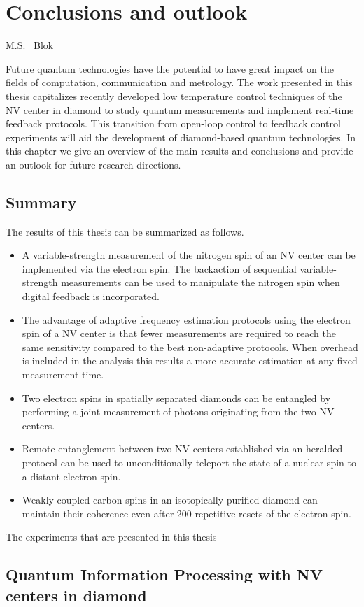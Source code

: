 \graphicspath{{./ch_conclusion_and_outlook/figures/}}

\chapter{Conclusions and outlook}
\label{ch:conclusion}

\begin{center} 
    \vspace{-1cm} {M.S. ~Blok} 
\end{center}

Future quantum technologies have the potential to have great impact on the fields of computation, communication and metrology. The work presented in this thesis capitalizes recently developed low temperature control techniques of the NV center in diamond to study quantum measurements and implement real-time feedback protocols. This transition from open-loop control to feedback control experiments will aid the development of diamond-based quantum technologies. In this chapter we give an overview of the main results and conclusions and provide an outlook for future research directions.
\clearpage

\section{Summary}
The results of this thesis can be summarized as follows.
\begin{itemize}

  \item A variable-strength measurement of the nitrogen spin of an NV center can be implemented via the electron spin. The backaction of sequential variable-strength measurements can be used to manipulate the nitrogen spin when digital feedback is incorporated.

  \item The advantage of adaptive frequency estimation protocols using the electron spin of a NV center is that fewer measurements are required to reach the same sensitivity compared to the best non-adaptive protocols. When overhead is included in the analysis this results a more accurate estimation at any fixed measurement time.

  \item Two electron spins in spatially separated diamonds can be entangled by performing a joint measurement of photons originating from the two NV centers. 

  \item Remote entanglement between two NV centers established via an heralded protocol can be used to unconditionally teleport the state of a nuclear spin to a distant electron spin.

  \item Weakly-coupled carbon spins in an isotopically purified diamond can maintain their coherence even after 200 repetitive resets of the electron spin.
  
\end{itemize}

The experiments that are presented in this thesis
\section{Quantum Information Processing with NV centers in diamond}





